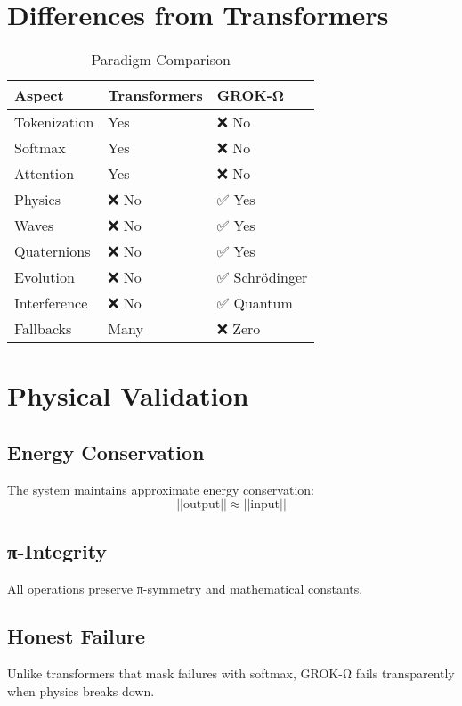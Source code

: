 \documentclass[11pt,a4paper]{article}
\begin{document}
\section{Differences from Transformers}

\begin{table}[H]
\centering
\caption{Paradigm Comparison}
\begin{tabular}{@{}lll@{}}
\toprule
Aspect & Transformers & GROK-Ω \\
\midrule
Tokenization & Yes & ❌ No \\
Softmax & Yes & ❌ No \\
Attention & Yes & ❌ No \\
Physics & ❌ No & ✅ Yes \\
Waves & ❌ No & ✅ Yes \\
Quaternions & ❌ No & ✅ Yes \\
Evolution & ❌ No & ✅ Schrödinger \\
Interference & ❌ No & ✅ Quantum \\
Fallbacks & Many & ❌ Zero \\
\bottomrule
\end{tabular}
\end{table}

\section{Physical Validation}

\subsection{Energy Conservation}

The system maintains approximate energy conservation:
\begin{equation}
||\text{output}|| \approx ||\text{input}||
\end{equation}

\subsection{π-Integrity}

All operations preserve π-symmetry and mathematical constants.

\subsection{Honest Failure}

Unlike transformers that mask failures with softmax, GROK-Ω fails transparently when physics breaks down.
\end{document}
